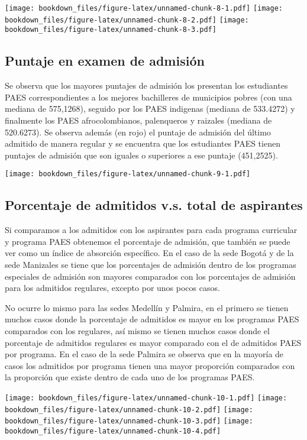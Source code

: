 \documentclass[]{article}
\theoremstyle{definition}
\theoremstyle{definition}
\theoremstyle{definition}
\theoremstyle{remark}
\begin{document}
\texttt{[image: bookdown\_files/figure-latex/unnamed-chunk-8-1.pdf]}
\texttt{[image: bookdown\_files/figure-latex/unnamed-chunk-8-2.pdf]}
\texttt{[image: bookdown\_files/figure-latex/unnamed-chunk-8-3.pdf]}

\subsection{Puntaje en examen de
admisión}\label{puntaje-en-examen-de-admision}

Se observa que los mayores puntajes de admisión los presentan los
estudiantes PAES correspondientes a los mejores bachilleres de
municipios pobres (con una mediana de 575,1268), seguido por los PAES
indigenas (mediana de 533.4272) y finalmente los PAES afrocolombianos,
palenqueros y raizales (mediana de 520.6273). Se observa además (en
rojo) el puntaje de admisión del último admitido de manera regular y se
encuentra que los estudiantes PAES tienen puntajes de admisión que son
iguales o superiores a ese puntaje (451,2525).

\texttt{[image: bookdown\_files/figure-latex/unnamed-chunk-9-1.pdf]}

\subsection{Porcentaje de admitidos v.s. total de
aspirantes}\label{porcentaje-de-admitidos-v.s.-total-de-aspirantes}

Si comparamos a los admitidos con los aspirantes para cada programa
curricular y programa PAES obtenemos el porcentaje de admisión, que
también se puede ver como un índice de absorción específico. En el caso
de la sede Bogotá y de la sede Manizales se tiene que los porcentajes de
admisión dentro de los programas especiales de admisión son mayores
comparados con los porcentajes de admisión para los admitidos regulares,
excepto por unos pocos casos.

No ocurre lo mismo para las sedes Medellín y Palmira, en el primero se
tienen muchos casos donde la porcentaje de admitidos es mayor en los
programas PAES comparados con los regulares, así mismo se tienen muchos
casos donde el porcentaje de admitidos regulares es mayor comparado con
el de admitidos PAES por programa. En el caso de la sede Palmira se
observa que en la mayoría de casos los admitidos por programa tienen una
mayor proporción comparados con la proporción que existe dentro de cada
uno de los programas PAES.

\texttt{[image: bookdown\_files/figure-latex/unnamed-chunk-10-1.pdf]}
\texttt{[image: bookdown\_files/figure-latex/unnamed-chunk-10-2.pdf]}
\texttt{[image: bookdown\_files/figure-latex/unnamed-chunk-10-3.pdf]}
\texttt{[image: bookdown\_files/figure-latex/unnamed-chunk-10-4.pdf]}
\end{document}

